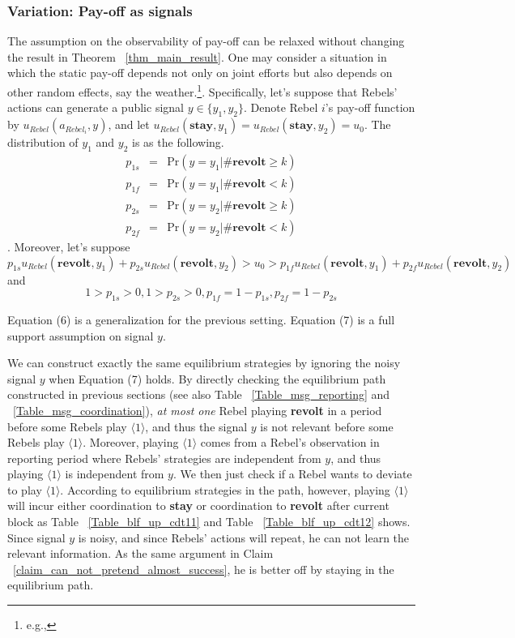 \documentclass[12pt,letterpaper]{article}
\theoremstyle{definition}
\theoremstyle{remark}
\theoremstyle{claim}
\begin{document}
\subsubsection{Variation: Pay-off as signals}
The assumption on the observability of pay-off can be relaxed without changing the result in Theorem ~\ref{thm_main_result}. One may consider a situation in which the static pay-off depends not only on joint efforts but also depends on other random effects, say the weather.\footnote{e.g.,\citep{SHADMEHR2011}}. Specifically, let's suppose that Rebels' actions can generate a public signal $y\in \{y_1,y_2\}$. Denote Rebel $i$'s pay-off function by $u_{Rebel}(a_{Rebel_i},y)$, and let $u_{Rebel}(\textbf{stay},y_1)=u_{Rebel}(\textbf{stay},y_2)=u_0$. The distribution of $y_1$ and $y_2$ is as the following.
\begin{eqnarray*}
p_{1s} &=& \mathrm {Pr}(y=y_1|\#\textbf{revolt}\geq k) \\
p_{1f} &=& \mathrm {Pr}(y=y_1|\#\textbf{revolt}< k) \\
p_{2s} &=& \mathrm {Pr}(y=y_2|\#\textbf{revolt}\geq k) \\
p_{2f} &=& \mathrm {Pr}(y=y_2|\#\textbf{revolt}< k) 
\end{eqnarray*}
. Moreover, let's suppose
\begin{equation}
p_{1s}u_{Rebel}(\textbf{revolt}, y_1)+p_{2s}u_{Rebel}(\textbf{revolt}, y_2)>u_0>p_{1f}u_{Rebel}(\textbf{revolt}, y_1)+p_{2f}u_{Rebel}(\textbf{revolt}, y_2)
\end{equation}
and
\begin{equation}
1>p_{1s}>0,1>p_{2s}>0,p_{1f}=1-p_{1s},p_{2f}=1-p_{2s}
\end{equation}

Equation (6) is a generalization for the previous setting. Equation (7) is a full support assumption on signal $y$. 

We can construct exactly the same equilibrium strategies by ignoring the noisy signal $y$ when Equation (7) holds. By directly checking the equilibrium path constructed in previous sections (see also Table ~\ref{Table_msg_reporting} and ~\ref{Table_msg_coordination}), \textit{at most one} Rebel playing \textbf{revolt} in a period before some Rebels play $\langle 1 \rangle$, and thus the signal $y$ is not relevant before some Rebels play $\langle 1 \rangle$. Moreover, playing $\langle 1 \rangle$ comes from a Rebel's observation in reporting period where Rebels' strategies are independent from $y$, and thus playing $\langle 1 \rangle$ is independent from $y$. We then just check if a Rebel wants to deviate to play $\langle 1 \rangle$. According to equilibrium strategies in the path, however, playing $\langle 1 \rangle$ will incur either coordination to \textbf{stay} or coordination to \textbf{revolt} after current block as Table ~\ref{Table_blf_up_cdt11} and Table ~\ref{Table_blf_up_cdt12} shows. Since signal $y$ is noisy, and since Rebels' actions will repeat, he can not learn the relevant information. As the same argument in Claim ~\ref{claim_can_not_pretend_almost_success}, he is better off by staying in the equilibrium path.
\end{document}
